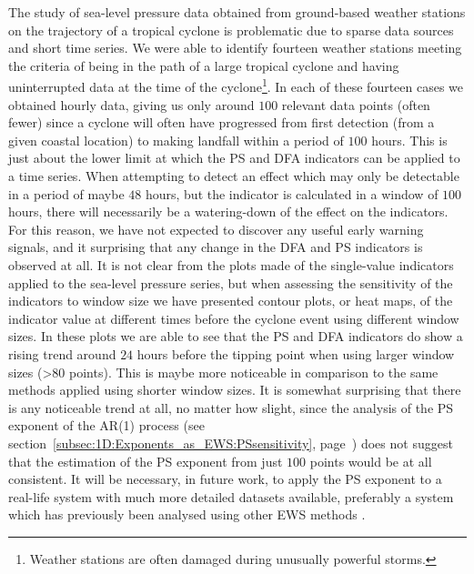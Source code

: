 The study of sea-level pressure data obtained from ground-based weather stations on the trajectory of a tropical cyclone is problematic due to sparse data sources and short time series. We were able to identify fourteen weather stations meeting the criteria of being in the path of a large tropical cyclone and having uninterrupted data at the time of the cyclone\footnote{Weather stations are often damaged during unusually powerful storms.}. In each of these fourteen cases we obtained hourly data, giving us only around $100$ relevant data points (often fewer) since a cyclone will often have progressed from first detection (from a given coastal location) to making landfall within a period of $100$ hours. This is just about the lower limit at which the PS and DFA indicators can be applied to a time series. When attempting to detect an effect which may only be detectable in a period of maybe $48$ hours, but the indicator is calculated in a window of $100$ hours, there will necessarily be a watering-down of the effect on the indicators. For this reason, we have not expected to discover any useful early warning signals, and it surprising that any change in the DFA and PS indicators is observed at all. It is not clear from the plots made of the single-value indicators applied to the sea-level pressure series, but when assessing the sensitivity of the indicators to window size we have presented contour plots, or heat maps, of the indicator value at different times before the cyclone event using different window sizes. In these plots we are able to see that the PS and DFA indicators do show a rising trend around $24$ hours before the tipping point when using larger window sizes (>80 points). This is maybe more noticeable in comparison to the same methods applied using shorter window sizes. It is somewhat surprising that there is any noticeable trend at all, no matter how slight, since the analysis of the PS exponent of the AR(1) process (see section~\ref{subsec:1D:Exponents_as_EWS:PSsensitivity}, page~\pageref{subsec:1D:Exponents_as_EWS:PSsensitivity}) does not suggest that the estimation of the PS exponent from just $100$ points would be at all consistent. It will be necessary, in future work, to apply the PS exponent to a real-life system with much more detailed datasets available, preferably a system which has previously been analysed using other EWS methods \citep{lenton2012}. 

